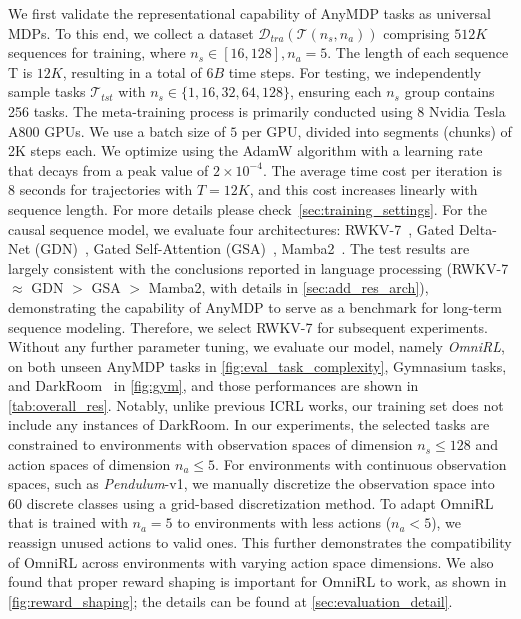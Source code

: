 \documentclass{article}
\renewcommand{\cite}[1]{\citep{#1}}
\begin{document}
We first validate the representational capability of AnyMDP tasks as universal MDPs. To this end, we collect a dataset $\mathcal{D}_{tra}(\mathcal{T}(n_s,n_a))$ comprising $512K$ sequences for training, where  $n_s\in[16, 128], n_a=5$. The length of each sequence T is $12K$, resulting in a total of $6B$ time steps. For testing, we independently sample tasks $\mathcal{T}_{tst}$ with $n_s\in\{1, 16, 32, 64, 128\}$, ensuring each $n_s$ group contains 256 tasks.
The meta-training process is primarily conducted using 8 Nvidia Tesla A800 GPUs. We use a batch size of $5$ per GPU, divided into segments (chunks) of 2K steps each. We optimize using the AdamW algorithm with a learning rate that decays from a peak value of $2\times10^{-4}$. The average time cost per iteration is $8$ seconds for trajectories with $T=12K$, and this cost increases linearly with sequence length. For more details please check~\cref{sec:training_settings}. For the causal sequence model, we evaluate four architectures: RWKV-7~\cite{peng2025rwkv}, Gated Delta-Net (GDN)~\cite{yang2025gated}, Gated Self-Attention (GSA)~\cite{zhanggated}, Mamba2~\cite{dao2024transformers}.
The test results are largely consistent with the conclusions reported in language processing (RWKV-7 $\approx$ GDN $>$  GSA $>$ Mamba2, with details in \cref{sec:add_res_arch}), demonstrating the capability of AnyMDP to serve as a benchmark for long-term sequence modeling. Therefore, we select RWKV-7 for subsequent experiments.
Without any further parameter tuning, we evaluate our model, namely \emph{OmniRL}, on both unseen AnyMDP tasks in \cref{fig:eval_task_complexity}, Gymnasium tasks, and DarkRoom~\cite{laskin2022context} in \cref{fig:gym}, and those performances are shown in \cref{tab:overall_res}. Notably, unlike previous ICRL works, our training set does not include any instances of DarkRoom. In our experiments, the selected tasks are constrained to environments with observation spaces of dimension $n_s \leq 128$ and action spaces of dimension $n_a \leq 5$. For environments with continuous observation spaces, such as \emph{Pendulum}-v1, we manually discretize the observation space into 60 discrete classes using a grid-based discretization method. To adapt OmniRL that is trained with $n_a=5$ to environments with less actions ($n_a<5$), we reassign unused actions to valid ones.
This further demonstrates the compatibility of OmniRL across environments with varying action space dimensions. We also found that proper reward shaping is important for OmniRL to work, as shown in  \cref{fig:reward_shaping}; the details can be found at \cref{sec:evaluation_detail}.
\end{document}

